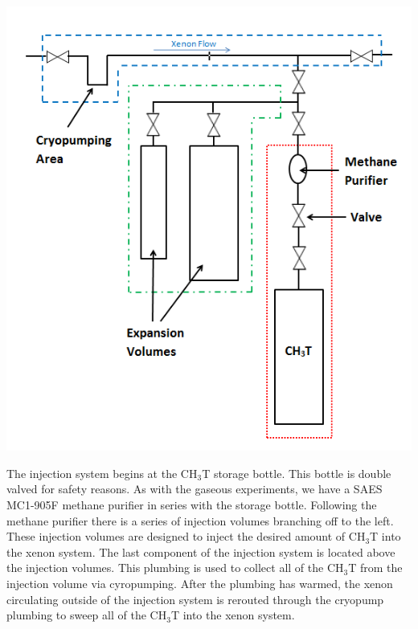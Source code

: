\documentclass[a4paper,12pt]{article}
\begin{document}
\begin{center}
\includegraphics[scale=0.8]{UMDInjectionSys.png}
\end{center}

The injection system begins at the CH$_3$T storage bottle.  This bottle is double valved for safety reasons.  As with the gaseous experiments, we have a SAES MC1-905F methane purifier in series with the storage bottle.  Following the methane purifier there is a series of injection volumes branching off to the left.  These injection volumes are designed to inject the desired amount of CH$_3$T into the xenon system.  The last component of the injection system is located above the injection volumes.  This plumbing is used to collect all of the CH$_3$T from the injection volume via cyropumping.  After the plumbing has warmed, the xenon circulating outside of the injection system is rerouted through the cryopump plumbing to sweep all of the CH$_3$T into the xenon system.
\end{document}
